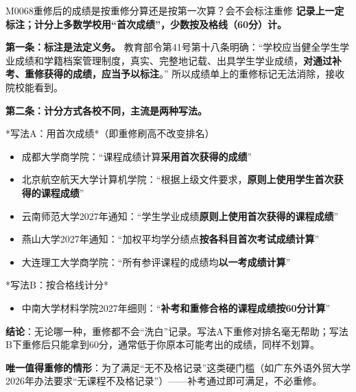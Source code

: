 \begin{qa}{M0068}{重修后的成绩是按重修分算还是按第一次算？会不会标注重修}
\textbf{记录上一定标注；计分上多数学校用“首次成绩”，少数按及格线（60分）计。}

\textbf{第一条：标注是法定义务。} 教育部令第41号第十八条明确：“学校应当健全学生学业成绩和学籍档案管理制度，真实、完整地记载、出具学生学业成绩，\textbf{对通过补考、重修获得的成绩，应当予以标注}。” 所以成绩单上的重修标记无法消除，接收院校能看到。

\textbf{第二条：计分方式各校不同，主流是两种写法。}

*写法A：用首次成绩*（即重修刷高不改变排名）
\begin{itemize}
  \item 成都大学商学院：“课程成绩计算\textbf{采用首次获得的成绩}”
  \item 北京航空航天大学计算机学院：“根据上级文件要求，\textbf{原则上使用学生首次获得的课程成绩}”
  \item 云南师范大学2027年通知：“学生学业成绩\textbf{原则上使用首次获得的课程成绩}”
  \item 燕山大学2027年通知：“加权平均学分绩点\textbf{按各科目首次考试成绩计算}”
  \item 大连理工大学商学院：“所有参评课程的成绩均\textbf{以一考成绩计算}”
\end{itemize}

*写法B：按合格线计分*
\begin{itemize}
  \item 中南大学材料学院2027年细则：“\textbf{补考和重修合格的课程成绩按60分计算}”
\end{itemize}

\textbf{结论}：无论哪一种，重修都不会“洗白”记录。写法A下重修对排名毫无帮助；写法B下重修后只能拿到60分，通常低于你原本可能考出的成绩，同样不划算。

\textbf{唯一值得重修的情形}：为了满足“无不及格记录”这类硬门槛（如广东外语外贸大学2026年办法要求“无课程不及格记录”）——补考通过即可满足，不必重修。
\end{qa}

